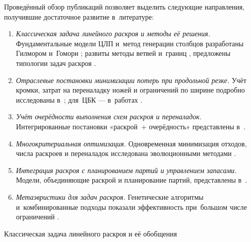 Проведённый обзор публикаций позволяет выделить следующие направления, получившие достаточное развитие в~литературе:

\begin{enumerate}
  \item \textit{Классическая задача линейного раскроя и методы её решения.}
  Фундаментальные модели ЦЛП и~метод генерации столбцов разработаны Гилмором и~Гомори \cite{gilmore1961linear,gilmore1963linear}; развиты методы ветвей и~границ \cite{vanderbeck2000integer,delorme2016bin}, предложены типологии задач раскроя \cite{dyckhoff1990typology,wascher2007typology}.
  \item \textit{Отраслевые постановки минимизации потерь при продольной резке.}
  Учёт кромки, затрат на переналадку ножей и ограничений по ширине подробно исследованы в~\cite{hinxman1980trimloss,mobasher2013,martina2022}; для~ЦБК --- в~работах \cite{воронов2004диссертация,урбан2015диссертация,воронин2000математические}.
  \item \textit{Учёт очерёдности выполнения схем раскроя и переналадок.}
  Интегрированные постановки «раскрой~+ очерёдность» представлены в~\cite{yanasse2007integrated,harjunkoski1996trimloss,westerlund1998trimloss_scheduling}.
  \item \textit{Многокритериальная оптимизация.}
  Одновременная минимизация отходов, числа раскроев и переналадок исследована эволюционными методами \cite{araujo2014genetic,golfeto2009genetic,sugianto2022rebar}.
  \item \textit{Интеграция раскроя с планированием партий и управлением запасами.}
  Модели, объединяющие раскрой и планирование партий, представлены в~\cite{nonas2000combined,melega2018review,poltroniere2016tema,leao2016decomposition}.
  \item \textit{Метаэвристики для задач раскроя.}
  Генетические алгоритмы и~комбинированные подходы показали эффективность при~большом числе ограничений \cite{haessler1991,goldberg1989genetic,kureichik1998,semenkina2013}.
\end{enumerate}

{Классическая задача линейного раскроя и её обобщения}\label{subsec:theor_ch/csp_classic}

